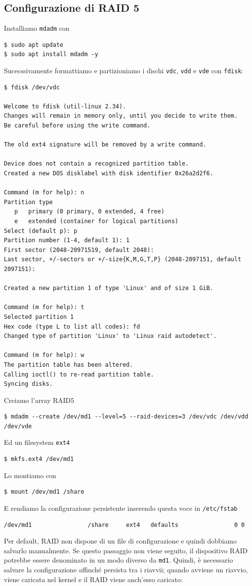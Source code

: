 \documentclass[11pt]{article}
\begin{document}
\subsection{Configurazione di RAID 5}
Installiamo \texttt{mdadm} con
\begin{verbatim}
$ sudo apt update
$ sudo apt install mdadm -y
\end{verbatim}
Sucecssivamente formattiamo e partizioniamo i dischi \texttt{vdc}, \texttt{vdd} e \texttt{vde} con \texttt{fdisk}:
\begin{lstlisting}
$ fdisk /dev/vdc

Welcome to fdisk (util-linux 2.34).
Changes will remain in memory only, until you decide to write them.
Be careful before using the write command.

The old ext4 signature will be removed by a write command.

Device does not contain a recognized partition table.
Created a new DOS disklabel with disk identifier 0x26a2d2f6.

Command (m for help): n
Partition type
   p   primary (0 primary, 0 extended, 4 free)
   e   extended (container for logical partitions)
Select (default p): p
Partition number (1-4, default 1): 1
First sector (2048-20971519, default 2048):
Last sector, +/-sectors or +/-size{K,M,G,T,P} (2048-2097151, default 2097151):

Created a new partition 1 of type 'Linux' and of size 1 GiB.

Command (m for help): t
Selected partition 1
Hex code (type L to list all codes): fd
Changed type of partition 'Linux' to 'Linux raid autodetect'.

Command (m for help): w
The partition table has been altered.
Calling ioctl() to re-read partition table.
Syncing disks.
\end{lstlisting}
Creiamo l'array RAID5
\begin{verbatim}
$ mdadm --create /dev/md1 --level=5 --raid-devices=3 /dev/vdc /dev/vdd /dev/vde
\end{verbatim}
Ed un filesystem \texttt{ext4}
\begin{verbatim}
$ mkfs.ext4 /dev/md1
\end{verbatim}
Lo montiamo con
\begin{verbatim}
$ mount /dev/md1 /share
\end{verbatim}
E rendiamo la configurazione persistente inserendo questa voce in \texttt{/etc/fstab}
\begin{verbatim}
/dev/md1                /share     ext4   defaults                0 0
\end{verbatim}
Per default, RAID non dispone di un file di configurazione e quindi dobbiamo salvarlo manualmente. Se questo passaggio non viene seguito, il dispositivo RAID potrebbe essere denominato in un modo diverso da \texttt{md1}. Quindi, è necessario salvare la configurazione affinché persista tra i riavvii; quando avviene un riavvio, viene caricata nel kernel e il RAID viene anch'esso caricato:
\end{document}
